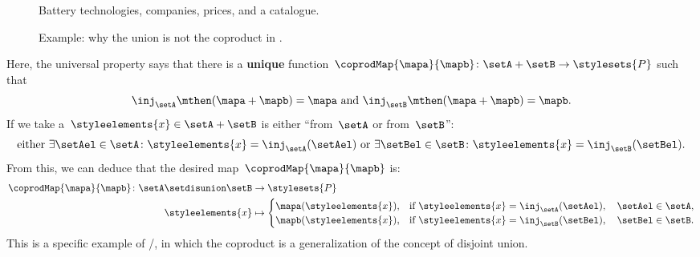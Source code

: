 \begin{example}
    \begin{figure*}[tbh]
        \centering
        \caption{Battery technologies, companies, prices, and a catalogue.}
        \label{fig:coprod_batteries_1}
    \end{figure*}

    \begin{figure*}[tbh]
        \centering
        \caption{Example: why the union is not the coproduct in \Set.}
        \label{fig:coprod_batteries_2}
    \end{figure*}

    Here, the universal property says that there is a \textbf{unique} function~$\coprodMap{\mapa}{\mapb}\colon \setA+\setB\to \stylesets{P}$ such that
    \begin{equation}
        \label{eq:exa-batt-factoring-maps}
        \inj_\setA\mthen (\mapa+ \mapb)=\mapa \text{ and }\inj_\setB\mthen (\mapa+ \mapb)=\mapb.
    \end{equation}
    If we take a~$\styleelements{x}\in \setA+\setB$ is either ``from~$\setA$ or from~$\setB$'':
    \begin{equation}
        \label{eq:exa-batt-explain-sum-map}
        \text{either } \exists \setAel\in \setA\colon \styleelements{x}=\inj_\setA(\setAel) \text{ or }\exists \setBel\in \setB\colon \styleelements{x}=\inj_\setB(\setBel).
    \end{equation}
    From this, we can deduce that the desired map~$\coprodMap{\mapa}{\mapb}$ is:
    \begin{equation}
        \label{eq:exa-batt-def-sum-map}
        \begin{aligned}
            \coprodMap{\mapa}{\mapb} \colon  \setA \setdisunion \setB & \to \stylesets{P} \\
            \styleelements{x}                              & \mapsto
            \begin{cases}
                \mapa(\styleelements{x}), & \text{if } \styleelements{x}=\inj_\setA(\setAel),\quad \setAel \in \setA, \\
                \mapb(\styleelements{x}), & \text{if } \styleelements{x}=\inj_\setB(\setBel),\quad \setBel \in \setB.
            \end{cases}
        \end{aligned}
    \end{equation}
    This is a specific example of \Set/\FinSet, in which the coproduct is a generalization of the concept of disjoint union.

\end{example}
